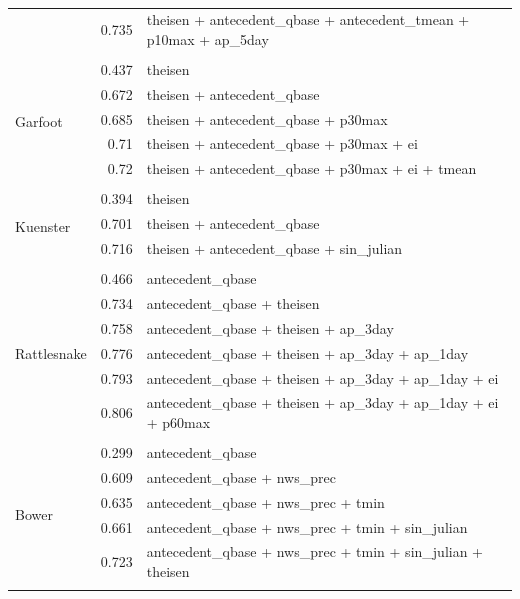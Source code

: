 \documentclass[10pt]{article}
\begin{document}
\begin{table}[h]
\begin{center}
\begin{tabular}{lrl}
 & 0.735 & theisen + antecedent\_qbase + antecedent\_tmean + p10max + ap\_5day\\ 
\vspace{2mm}\\ \multirow{6}{*}{Garfoot} & 0.437 & theisen\\ 
 & 0.672 & theisen + antecedent\_qbase\\ 
 & 0.685 & theisen + antecedent\_qbase + p30max\\ 
 & 0.71 & theisen + antecedent\_qbase + p30max + ei\\ 
 & 0.72 & theisen + antecedent\_qbase + p30max + ei + tmean\\ 
\vspace{2mm}\\ \multirow{4}{*}{Kuenster} & 0.394 & theisen\\ 
 & 0.701 & theisen + antecedent\_qbase\\ 
 & 0.716 & theisen + antecedent\_qbase + sin\_julian\\ 
\vspace{2mm}\\ \multirow{7}{*}{Rattlesnake} & 0.466 & antecedent\_qbase\\ 
 & 0.734 & antecedent\_qbase + theisen\\ 
 & 0.758 & antecedent\_qbase + theisen + ap\_3day\\ 
 & 0.776 & antecedent\_qbase + theisen + ap\_3day + ap\_1day\\ 
 & 0.793 & antecedent\_qbase + theisen + ap\_3day + ap\_1day + ei\\ 
 & 0.806 & antecedent\_qbase + theisen + ap\_3day + ap\_1day + ei + p60max\\ 
\vspace{2mm}\\ \multirow{6}{*}{Bower} & 0.299 & antecedent\_qbase\\ 
 & 0.609 & antecedent\_qbase + nws\_prec\\ 
 & 0.635 & antecedent\_qbase + nws\_prec + tmin\\ 
 & 0.661 & antecedent\_qbase + nws\_prec + tmin + sin\_julian\\ 
 & 0.723 & antecedent\_qbase + nws\_prec + tmin + sin\_julian + theisen\\ 
\vspace{2mm}\\     \end{tabular}
    \caption{\label{sed_r_square_nosnow}}
    \end{center}
\end{table}
\end{document}
